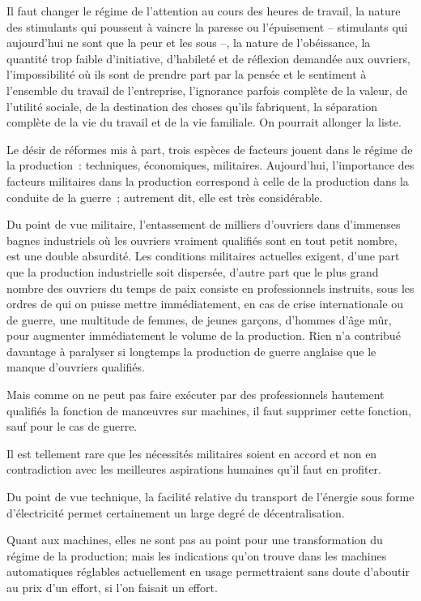 \documentclass[french,twoside]{book} %
\begin{document}
Il faut changer le régime de l'attention au cours des heures de travail, la nature des stimulants qui poussent à vaincre la paresse ou l'épuisement – stimulants qui aujourd'hui ne sont que la peur et les sous –, la nature de l'obéissance, la quantité trop faible d'initiative, d'habileté et de réflexion demandée aux ouvriers, l'impossibilité où ils sont de prendre part par la pensée et le sentiment à l'ensemble du travail de l'entreprise, l'ignorance parfois complète de la valeur, de l'utilité sociale, de la destination des choses qu'ils fabriquent, la séparation complète de la vie du travail et de la vie familiale. On pourrait allonger la liste.\par
Le désir de réformes mis à part, trois espèces de facteurs jouent dans le régime de la production : techniques, économiques, militaires. Aujourd'hui, l'importance des facteurs militaires dans la production correspond à celle de la production dans la conduite de la guerre ; autrement dit, elle est très considérable.\par
Du point de vue militaire, l'entassement de milliers d'ouvriers dans d'immenses bagnes industriels où les ouvriers vraiment qualifiés sont en tout petit nombre, est une double absurdité. Les conditions militaires actuelles exigent, d'une part que la production industrielle soit dispersée, d'autre part que le plus grand nombre des ouvriers du temps de paix consiste en professionnels instruits, sous les ordres de qui on puisse mettre immédiatement, en cas de crise internationale ou de guerre, une multitude de femmes, de jeunes garçons, d'hommes d'âge mûr, pour augmenter immédiatement le volume de la production. Rien n'a contribué davantage à paralyser si longtemps la production de guerre anglaise que le manque d'ouvriers qualifiés.\par
Mais comme on ne peut pas faire exécuter par des professionnels hautement qualifiés la fonction de manœuvres sur machines, il faut supprimer cette fonction, sauf pour le cas de guerre.\par
Il est tellement rare que les nécessités militaires soient en accord et non en contradiction avec les meilleures aspirations humaines qu'il faut en profiter.\par
Du point de vue technique, la facilité relative du transport de l'énergie sous forme d'électricité permet certainement un large degré de décentralisation.\par
Quant aux machines, elles ne sont pas au point pour une transformation du régime de la production; mais les indications qu'on trouve dans les machines automatiques réglables actuellement en usage permettraient sans doute d'aboutir au prix d'un effort, si l'on faisait un effort.\par
\end{document}
